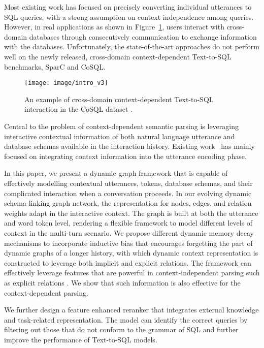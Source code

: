 \documentclass[letterpaper]{article} \usepackage{aaai21}  \usepackage{times}  \usepackage{helvet} \usepackage{courier}  \usepackage[hyphens]{url}  \usepackage{graphicx} \urlstyle{rm} \def\UrlFont{\rm}  \usepackage{natbib}  \usepackage{caption} \frenchspacing  \setlength{\pdfpagewidth}{8.5in}  \setlength{\pdfpageheight}{11in}
\begin{document}
Most existing work has focused on precisely converting individual utterances to SQL queries, with a strong assumption on context independence among queries.
However, in real applications as shown in Figure~\ref{Intro}, users interact with cross-domain databases through consecutively communication to exchange information with the databases. 
Unfortunately, the state-of-the-art approaches do not perform well on the newly released, cross-domain context-dependent Text-to-SQL benchmarks, SparC and CoSQL.
\begin{figure}[t]
	\centering
\texttt{[image: image/intro\_v3]}
	\caption{An example of cross-domain context-dependent Text-to-SQL interaction in the CoSQL dataset \cite{DBLP:conf/emnlp/YuZELXPLTSLJYSC19}. }
	\label{Intro}
\end{figure}

Central to the problem of context-dependent semantic parsing is leveraging interactive contextual information of both natural language utterance and database schemas available in the interaction history. Existing work~\cite{DBLP:conf/naacl/SuhrIA18,DBLP:conf/emnlp/ZhangYESXLSXSR19,DBLP:conf/ijcai/LiuCGLZZ20} has mainly focused on integrating context information into the utterance encoding phase. 

In this paper, we present a dynamic graph framework that is capable of effectively modelling contextual utterances, tokens, database schemas, and their complicated interaction when a conversation proceeds.
In our evolving dynamic schema-linking graph network, the representation for nodes, edges, and relation weights adapt in the interactive context. The graph is built at both the utterance and word token level, rendering a flexible framework to model different levels of context in the multi-turn scenario. 
We propose different dynamic memory decay mechanisms to incorporate inductive bias that encourages forgetting the part of dynamic graphs of a longer history, with which dynamic context representation is constructed to leverage both implicit and explicit relations. The framework can effectively leverage features that are powerful in context-independent parsing such as explicit relations \cite{DBLP:conf/acl/WangSLPR20}. We show that such information is also effective for the context-dependent parsing. 

We further design a feature enhanced reranker that integrates external knowledge and task-related representation. The model can identify the correct queries by filtering out those that do not conform to the grammar of SQL and further improve the performance of Text-to-SQL models.
\end{document}
